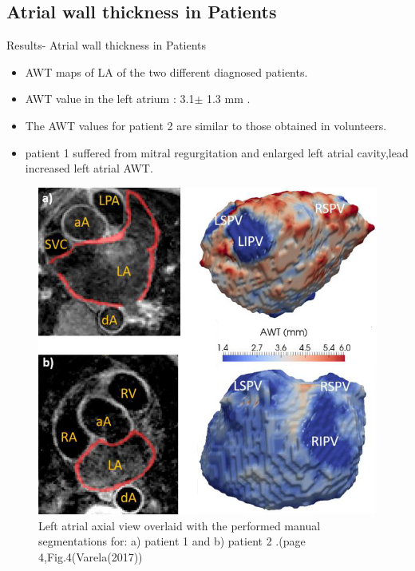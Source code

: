 \documentclass[aspectratio=43]{beamer}
\begin{document}
\newpage
\subsection{Atrial wall thickness in Patients}
\begin{frame}{Results- Atrial wall thickness in Patients}
\begin{minipage}{0.5\textwidth}\raggedleft
\begin{itemize}
        \item AWT maps of LA of the two different diagnosed patients.
          \item AWT value in the left atrium : 3.1\begin{math}\pm \end{math} 1.3 mm .
        \item The AWT values for patient 2 are similar to those obtained in volunteers.
        \item patient 1 suffered from mitral regurgitation and enlarged left atrial cavity,lead increased left atrial AWT.
        
\end{itemize}
\end{minipage}
\begin{minipage}{0.4\textwidth}\raggedleft
\begin{figure}[h!]


\includegraphics[width=\linewidth]{img/img5}

\caption {Left atrial axial view overlaid with the performed manual segmentations for: a) patient 1 and b) patient 2 .(page 4,Fig.4(Varela(2017))}
\end{figure}
\end{minipage}

\noindent



\end{frame}
\end{document}
